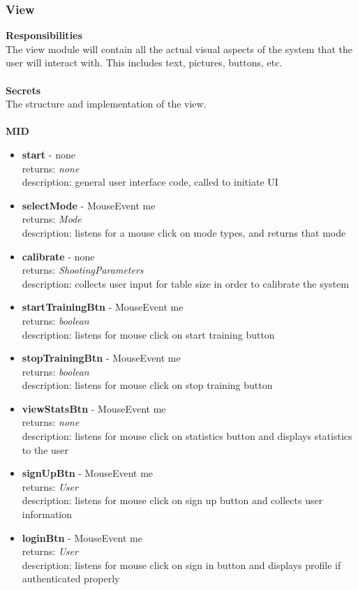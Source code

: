 \documentclass[11pt]{article}
\begin{document}
\subsubsection*{View}
\textbf{Responsibilities} \\
The view module will contain all the actual visual aspects of the system that the user will interact with. This includes text, pictures, buttons, etc. \\ \\
\textbf{Secrets} \\
The structure and implementation of the view. \\ \\
\textbf{MID}
\begin{itemize}
\item \textbf{start} - none \\ returns: \textit{none} \\ description: general user interface code, called to initiate UI
\item \textbf{selectMode} - MouseEvent me\\ returns: \textit{Mode} \\ description: listens for a mouse click on mode types, and returns that mode
\item \textbf{calibrate} - none \\ returns: \textit{ShootingParameters} \\ description: collects user input for table size in order to calibrate the system
\item \textbf{startTrainingBtn} - MouseEvent me \\ returns: \textit{boolean} \\ description: listens for mouse click on start training button
\item \textbf{stopTrainingBtn} - MouseEvent me \\ returns: \textit{boolean} \\ description: listens for mouse click on stop training button
\item \textbf{viewStatsBtn} - MouseEvent me \\ returns: \textit{none} \\ description: listens for mouse click on statistics button and displays statistics to the user
\item \textbf{signUpBtn} - MouseEvent me \\ returns: \textit{User} \\ description: listens for mouse click on sign up button and collects user information
\item \textbf{loginBtn} - MouseEvent me \\ returns: \textit{User} \\ description: listens for mouse click on sign in button and displays profile if authenticated properly
\end{itemize}
\end{document}
